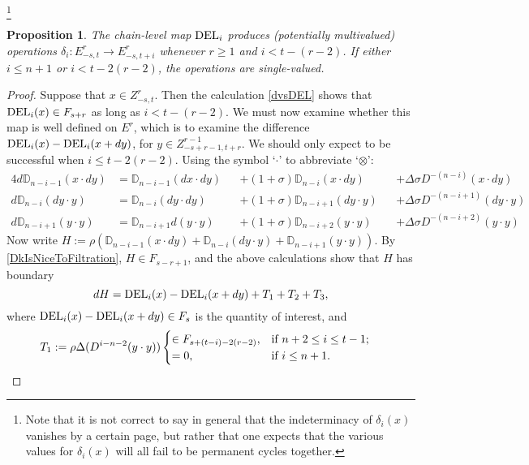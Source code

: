 \documentclass[11pt]{amsart}
\theoremstyle{plain}
\newtheorem{prop}[thm]{Proposition}
\theoremstyle{definition}
\renewcommand{\to}{\longrightarrow}
\newcommand{\twist}{\sigma}
\theoremstyle{plain}
\begin{document}
\footnote{Note that it is not correct to say in general that the indeterminacy of $\delta_i(x)$ vanishes by a certain page, but rather that one expects that the various values for $\delta_i(x)$ will all fail to be permanent cycles together.}
\begin{prop}
The chain-level map $\textup{DEL}_i$ produces (potentially multivalued) operations $\delta_i:E^r_{-s,t}\to E^r_{-s,t+i}$ whenever $r\geq1$ and $i<t-(r-2)$. If either $i\leq n+1$ or $i<t-2(r-2)$, the operations are single-valued.
\end{prop}
\begin{proof}
Suppose that $x\in Z^r_{-s,t}$. Then the calculation \ref{dvsDEL} shows that $\textup{DEL}_i(x)\in F_{s+r}$ as long as $i<t-(r-2)$. We must now examine whether this map is well defined on $E^r$, which is to examine the difference $\textup{DEL}_i(x)-\textup{DEL}_i(x+dy)$, for $y\in Z^{r-1}_{-s+r-1,t+r}$. We should only expect to be successful when $i\leq t-2(r-2)$.
Using the symbol `$\cdot$' to abbreviate `$\otimes$':
\small
\begin{alignat*}{4}
d\mathbb{D}_{n-i-1}(x\cdot dy)&=
{\mathbb{D}_{n-i-1}(dx\cdot dy)}&&+
(1{+}\twist)\mathbb{D}_{n-i}(x\cdot dy)&&+
\Delta\twist D^{-(n-i)}(x\cdot dy)\\
d\mathbb{D}_{n-i}(dy\cdot y)&=
\mathbb{D}_{n-i}(dy\cdot dy)&&+
(1{+}\twist)\mathbb{D}_{n-i+1}(dy\cdot y)&&+
\Delta\twist D^{-(n-i+1)}(dy\cdot y)\\
d\mathbb{D}_{n-i+1}(y\cdot y)&=
\mathbb{D}_{n-i+1}d(y\cdot y)&&+
{(1{+}\twist)\mathbb{D}_{n-i+2}(y\cdot y)}&&+
\Delta\twist D^{-(n-i+2)}(y\cdot y)
\end{alignat*}
\normalsize
Now write $H:=\rho(\mathbb{D}_{n-i-1}(x\cdot dy)+\mathbb{D}_{n-i}(dy\cdot y)+\mathbb{D}_{n-i+1}(y\cdot y))$. By \ref{DkIsNiceToFiltration}, $H\in F_{s-r+1}$, and the above calculations show that $H$ has boundary
\small
\[dH=\textup{DEL}_i(x)-\textup{DEL}_i(x+dy)+T_1+T_2+T_3,\]
\normalsize
where $\textup{DEL}_i(x)-\textup{DEL}_i(x+dy)\in F_s$ is the quantity of interest, and
\begin{align*}
T_1:=\rho\Delta(D^{i-n-2}(y\cdot y))&\begin{cases}
\in F_{s+(t-i)-2(r-2)},&\textup{if }n+2\leq i\leq t-1;\\
=0,&\textup{if }i\leq n+1.
\end{cases}

\end{align*}
\end{proof}
\end{document}
